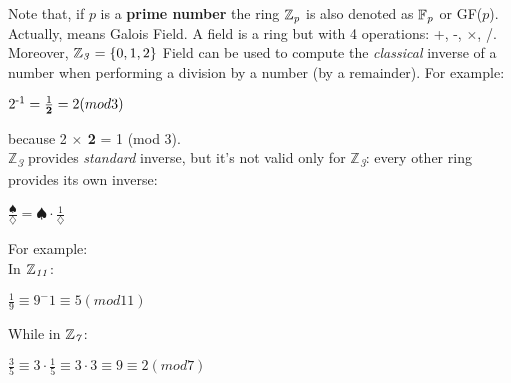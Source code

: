 \documentclass{article}
\begin{document}
Note that, if $p$ is a \textbf{prime number} the ring $\mathbb{Z}\textsubscript{\textit{p}}$ is also denoted as $\mathbb{F}\textsubscript{\textit{p}}$ or GF($p$). Actually, means Galois Field. A field is a ring but with 4 operations: +, -, $\times$, /.\\

Moreover, $\mathbb{Z}\textsubscript{\textit{3}} = \{0,1,2\}$ Field can be used to compute the \textit{classical} inverse of a number when performing a division by a number (by a remainder). For example: \\
\begin{center}
$2\textsuperscript{-1} = \frac{1}{\textbf{2}} = 2 (mod 3)$
\end{center}
because 2 \textbf{$\times$ 2} = 1 (mod 3).\\

$\mathbb{Z}$\textsubscript{\textit{3}} provides \textit{standard} inverse, but it's not valid only for $\mathbb{Z}$\textsubscript{\textit{3}}: every other ring provides its own inverse:\\
\begin{center}
$\frac{\spadesuit}{\diamondsuit} = \spadesuit \cdot \frac{1}{\diamondsuit}$
\end{center}

For example:\\
In $\mathbb{Z}\textsubscript{\textit{11}}$:
\begin{center}
$\frac{1}{9} \equiv 9^-1 \equiv 5 (mod 11)$
\end{center}
While in $\mathbb{Z}\textsubscript{\textit{7}}$:
\begin{center}
$\frac{3}{5} \equiv 3 \cdot \frac{1}{5} \equiv 3 \cdot 3 \equiv 9 \equiv 2 (mod 7)$
\end{center}
\end{document}
